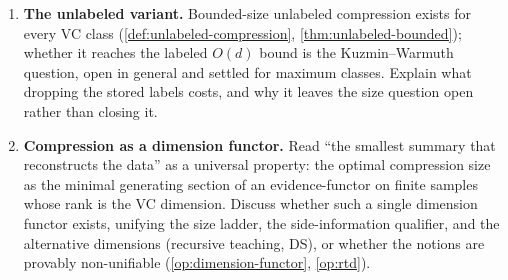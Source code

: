 \begin{enumerate}[leftmargin=*,itemsep=3pt]
\item \textbf{The unlabeled variant.} Bounded-size unlabeled compression exists for every VC class (\cref{def:unlabeled-compression}, \cref{thm:unlabeled-bounded}); whether it reaches the labeled $O(d)$ bound is the Kuzmin--Warmuth question, open in general and settled for maximum classes. Explain what dropping the stored labels costs, and why it leaves the size question open rather than closing it.

\item \textbf{Compression as a dimension functor.} Read ``the smallest summary that reconstructs the data'' as a universal property: the optimal compression size as the minimal generating section of an evidence-functor on finite samples whose rank is the VC dimension. Discuss whether such a single dimension functor exists, unifying the size ladder, the side-information qualifier, and the alternative dimensions (recursive teaching, DS), or whether the notions are provably non-unifiable (\cref{op:dimension-functor}, \cref{op:rtd}).
\end{enumerate}
